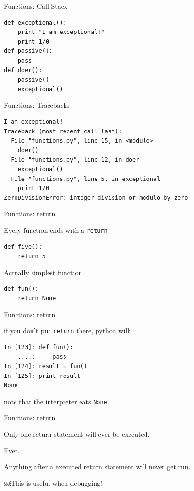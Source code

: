 \documentclass{beamer}
\begin{document}
\begin{frame}[fragile]{Functions: Call Stack}

\begin{verbatim}
def exceptional():
    print "I am exceptional!"
    print 1/0
def passive():
    pass
def doer():
    passive()
    exceptional()
\end{verbatim}

\end{frame}

\begin{frame}[fragile]{Functions: Tracebacks}

\begin{verbatim}
I am exceptional!
Traceback (most recent call last):
  File "functions.py", line 15, in <module>
    doer()
  File "functions.py", line 12, in doer
    exceptional()
  File "functions.py", line 5, in exceptional
    print 1/0
ZeroDivisionError: integer division or modulo by zero
\end{verbatim}

\end{frame}

\begin{frame}[fragile]{Functions: return}

{\Large Every function ends with a \verb+return+}

\begin{verbatim}
def five():
    return 5
\end{verbatim}

{\Large Actually simplest function}
\begin{verbatim}
def fun():
    return None
\end{verbatim}
\end{frame}

\begin{frame}[fragile]{Functions: return}

{\Large if you don't put \verb+return+ there, python will:}

\begin{verbatim}
In [123]: def fun():
   .....:     pass
In [124]: result = fun()
In [125]: print result
None
\end{verbatim}

{\Large note that the interpreter eats \verb+None+}

\end{frame}


\begin{frame}{Functions: return}

\vspace{0.25in}
{\Large Only one return statement will ever be executed.}

\pause
\vspace{0.25in}
{\Large Ever.}

\pause
\vspace{0.25in}
{\Large Anything after a executed return statement will never get run.}

\vspace{0.25in}
{\Large ￼This is useful when debugging! }

\end{frame}
\end{document}
